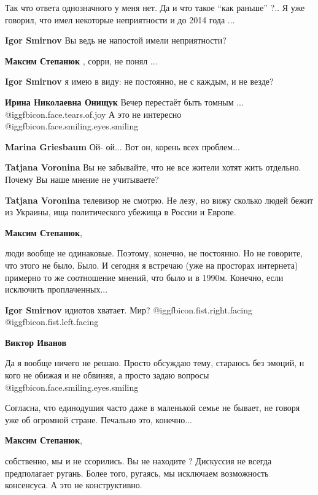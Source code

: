\begin{itemize}
\begin{itemize}
Так что ответа однозначного у меня нет. Да и что такое \enquote{как раньше} ?.. Я уже
говорил, что имел некоторые неприятности и до 2014 года ...


\textbf{Igor Smirnov} Вы ведь не напостой имели неприятности?

\textbf{Максим Степанюк} , сорри, не понял ...

\textbf{Igor Smirnov} я имею в виду: не постоянно, не с каждым, и не везде?

\textbf{Ирина Николаевна Онищук}
Вечер перестаёт быть томным ... @igg{fbicon.face.tears.of.joy}  А это не интересно  @igg{fbicon.face.smiling.eyes.smiling} 

\textbf{Marina Griesbaum}
Ой- ой... Вот он, корень всех проблем...

\textbf{Tatjana Voronina} Вы не забывайте, что не все жители хотят жить отдельно. Почему Вы наше мнение не учитываете?

\textbf{Tatjana Voronina} телевизор не смотрю. Не лезу, но вижу сколько людей бежит из Украины, ища политического убежища в России и Европе.

\textbf{Максим Степанюк}, 

люди вообще не одинаковые. Поэтому, конечно, не постоянно. Но не говорите, что
этого не было. Было. И сегодня я встречаю (уже на просторах интернета) примерно
то же соотношение мнений, что было и в 1990м. Конечно, если исключить
проплаченных...

\textbf{Igor Smirnov} идиотов хватает. Мир? @igg{fbicon.fist.right.facing}  @igg{fbicon.fist.left.facing} 

\textbf{Виктор Иванов} 

Да я вообще ничего не решаю. Просто обсуждаю тему, стараюсь без эмоций, н кого
не обижая и не обвиняя, а просто задаю вопросы @igg{fbicon.face.smiling.eyes.smiling} 

Согласна, что единодушия часто даже в маленькой семье не бывает, не говоря уже
об огромной стране. Печально это, конечно...

\textbf{Максим Степанюк}, 

собственно, мы и не ссорились. Вы не находите ? Дискуссия не всегда
предполагает ругань. Более того, ругаясь, мы исключаем возможность консенсуса.
А это не конструктивно.


\end{itemize}
\end{itemize}
